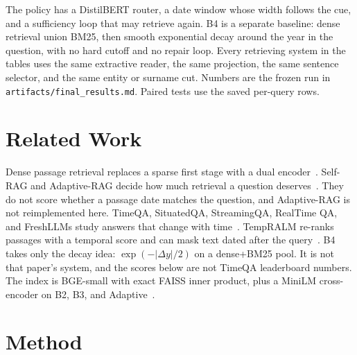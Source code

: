 \documentclass[sigconf,anonymous,review]{acmart}
\begin{document}
The policy has a DistilBERT router, a date window whose width follows the cue, and a sufficiency loop that may retrieve again.
B4 is a separate baseline: dense retrieval union BM25, then smooth exponential decay around the year in the question, with no hard cutoff and no repair loop.
Every retrieving system in the tables uses the same extractive reader, the same projection, the same sentence selector, and the same entity or surname cut.
Numbers are the frozen run in \texttt{artifacts/final\_results.md}.
Paired tests use the saved per-query rows.

\section{Related Work}

Dense passage retrieval replaces a sparse first stage with a dual encoder~\cite{karpukhin2020dpr}.
Self-RAG and Adaptive-RAG decide how much retrieval a question deserves~\cite{asai2024selfrag,jeong2024adaptiverag}.
They do not score whether a passage date matches the question, and Adaptive-RAG is not reimplemented here.
TimeQA, SituatedQA, StreamingQA, RealTime QA, and FreshLLMs study answers that change with time~\cite{chen2021timeqa,zhang2021situatedqa,liska2022streamingqa,kasai2023realtimeqa,vu2023freshqa}.
TempRALM re-ranks passages with a temporal score and can mask text dated after the query~\cite{gade2024tempralm}.
B4 takes only the decay idea: $\exp(-|\Delta y|/2)$ on a dense+BM25 pool.
It is not that paper's system, and the scores below are not TimeQA leaderboard numbers.
The index is BGE-small with exact FAISS inner product, plus a MiniLM cross-encoder on B2, B3, and Adaptive~\cite{xiao2024cpack,johnson2019faiss,wang2020minilm}.

\section{Method}
\end{document}
